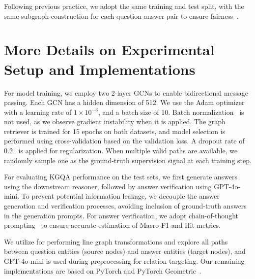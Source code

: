 Following previous practice, we adopt the same training and test split, with the same subgraph construction for each question-answer pair to ensure fairness~\cite{jiang2022unikgqa,luo2024rog,li2024simple,mavromatis2024gnn}.

\section{More Details on Experimental Setup and Implementations}
\label{app:exp}
 For model training, we employ two 2-layer GCNs to enable bidirectional message passing. Each GCN has a hidden dimension of 512. We use the Adam optimizer~\cite{kingma2014adam} with a learning rate of $1\times10^{-3}$, and a batch size of 10. Batch normalization~\cite{ioffe2015batch} is not used, as we observe gradient instability when it is applied. The graph retriever is trained for 15 epochs on both datasets, and model selection is performed using cross-validation based on the validation loss. A dropout rate of 0.2~\cite{srivastava2014dropout} is applied for regularization. When multiple valid paths are available, we randomly sample one as the ground-truth supervision signal at each training step.

For evaluating KGQA performance on the test sets, we first generate answers using the downstream reasoner, followed by answer verification using GPT-4o-mini. To prevent potential information leakage, we decouple the answer generation and verification processes, avoiding inclusion of ground-truth answers in the generation prompts. For answer verification, we adopt chain-of-thought prompting~\cite{wei2022chain} to ensure accurate estimation of Macro-F1 and Hit metrics.

 We utilize \cite{hagberg2008exploring} for performing line graph transformations and explore all paths between question entities (source nodes) and answer entities (target nodes), and GPT-4o-mini is used during preprocessing for relation targeting. Our remaining implementations are based on PyTorch\cite{paszke2019pytorchimperativestylehighperformance} and PyTorch Geometric~\cite{fey2019fast}.

